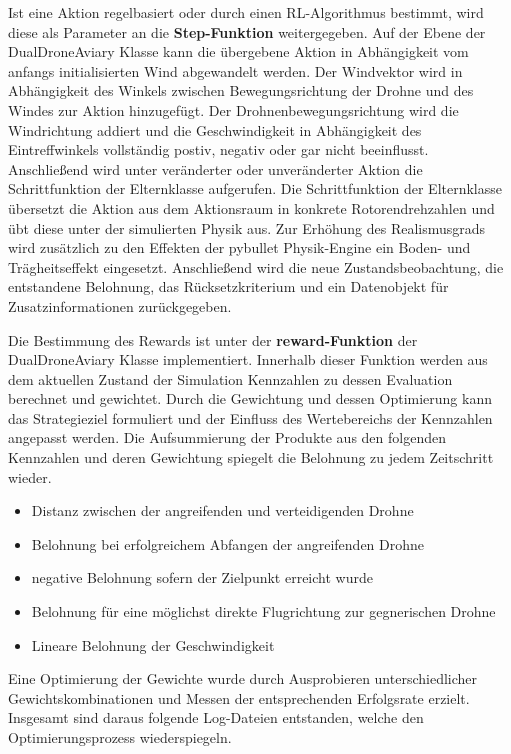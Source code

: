 Ist eine Aktion regelbasiert oder durch einen RL-Algorithmus bestimmt, wird diese als Parameter an die \textbf{Step-Funktion} weitergegeben.
Auf der Ebene der DualDroneAviary Klasse kann die übergebene Aktion in Abhängigkeit vom anfangs initialisierten Wind abgewandelt werden.
Der Windvektor wird in Abhängigkeit des Winkels zwischen Bewegungsrichtung der Drohne und des Windes zur Aktion hinzugefügt.
Der Drohnenbewegungsrichtung wird die Windrichtung addiert und die Geschwindigkeit in Abhängigkeit des Eintreffwinkels vollständig postiv, negativ oder gar nicht beeinflusst.
Anschließend wird unter veränderter oder unveränderter Aktion die Schrittfunktion der Elternklasse aufgerufen.
Die Schrittfunktion der Elternklasse übersetzt die Aktion aus dem Aktionsraum in konkrete Rotorendrehzahlen und übt diese unter der simulierten Physik aus.
Zur Erhöhung des Realismusgrads wird zusätzlich zu den Effekten der pybullet Physik-Engine ein Boden- und Trägheitseffekt eingesetzt.
Anschließend wird die neue Zustandsbeobachtung, die entstandene Belohnung, das Rücksetzkriterium und ein Datenobjekt für Zusatzinformationen zurückgegeben.

Die Bestimmung des Rewards ist unter der \textbf{reward-Funktion} der DualDroneAviary Klasse implementiert.
Innerhalb dieser Funktion werden aus dem aktuellen Zustand der Simulation Kennzahlen zu dessen Evaluation berechnet und gewichtet.
Durch die Gewichtung und dessen Optimierung kann das Strategieziel formuliert und der Einfluss des Wertebereichs der Kennzahlen angepasst werden.
Die Aufsummierung der Produkte aus den folgenden Kennzahlen und deren Gewichtung spiegelt die Belohnung zu jedem Zeitschritt wieder.
\begin{itemize}
    \item Distanz zwischen der angreifenden und verteidigenden Drohne
    \item Belohnung bei erfolgreichem Abfangen der angreifenden Drohne
    \item negative Belohnung sofern der Zielpunkt erreicht wurde
    \item Belohnung für eine möglichst direkte Flugrichtung zur gegnerischen Drohne
    \item Lineare Belohnung der Geschwindigkeit
\end{itemize}
Eine Optimierung der Gewichte wurde durch Ausprobieren unterschiedlicher Gewichtskombinationen und Messen der entsprechenden Erfolgsrate erzielt.
Insgesamt sind daraus folgende Log-Dateien entstanden, welche den Optimierungsprozess wiederspiegeln.

